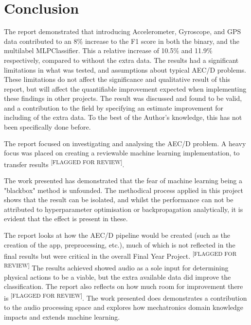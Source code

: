 \documentclass{UoNMCHA}
\newcommand{\flagforreview}{\textsuperscript{\color{red} [FLAGGED FOR REVIEW]}}
\numberwithin{equation}{section}
\begin{document}
\clearpage \section{Conclusion}\label{sec:Conclusion}

The report demonstrated that introducing Accelerometer, Gyroscope, and GPS data contributed to an 8\% increase to the F1 score in both the binary, and the multilabel MLPClassifier. This a relative increase of 10.5\% and 11.9\% respectively, compared to without the extra data. The results had a significant limitations in what was tested, and assumptions about typical AEC/D problems. These limitations do not affect the significance and qualitative result of this report, but will affect the quantifiable improvement expected when implementing these findings in other projects. 
The result was discussed and found to be valid, and a contribution to the field by specifying an estimate improvement for including of the extra data. To the best of the Author's knowledge, this has not been specifically done before.

The report focused on investigating and analysing the AEC/D problem. A heavy focus was placed on creating a reviewable machine learning implementation, to transfer results\flagforreview.

The work presented has demonstrated that the fear of machine learning being a "blackbox" method is unfounded. The methodical process applied in this project shows that the result can be isolated, and whilst the performance can not be attributed to hyperparameter optimisation or backpropagation analytically, it is evident that the effect is present in these. 

The report looks at how the AEC/D pipeline would be created (such as the creation of the app, preprocessing, etc.), much of which is not reflected in the final results but were critical in the overall Final Year Project.\flagforreview %
The results achieved showed audio as a sole input for determining physical actions to be a viable, but the extra available data did improve the classification. The report also reflects on how much room for improvement there is\flagforreview.
The work presented does demonstrates a contribution to the audio processing space and explores how mechatronics domain knowledge impacts and extends machine learning.
\end{document}
